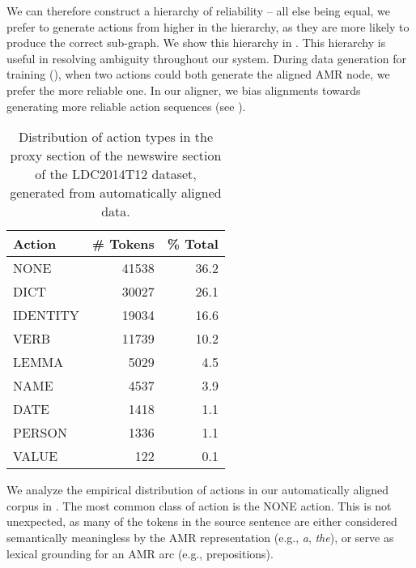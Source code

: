\documentclass[11pt]{article}
\newcommand\w[1]{\textit{#1}} %
\begin{document}

We can therefore construct a hierarchy of reliability -- all else being equal, we
  prefer to generate actions from higher in the hierarchy, as they are more likely
  to produce the correct sub-graph.
We show this hierarchy in .
This hierarchy is useful in resolving ambiguity throughout our system. 
During data generation for training (), when two actions could both generate the aligned AMR node, we prefer the more reliable one.
In our aligner, we bias alignments towards generating more reliable action sequences (see ).



%
%

\begin{table}[h]
\begin{center}
\begin{tabular}{l|rr}
\bf Action & \bf \# Tokens & \bf \% Total \\ \hline
NONE & 41538 & 36.2 \\
DICT & 30027 & 26.1 \\
IDENTITY & 19034 & 16.6 \\
VERB & 11739 & 10.2 \\
LEMMA & 5029 & 4.5 \\
NAME & 4537 & 3.9 \\
DATE & 1418 & 1.1 \\
PERSON & 1336 & 1.1 \\
VALUE & 122  & 0.1\\
\end{tabular}
\end{center}
\caption{\label{tab:distro} Distribution of action types in the proxy section of the newswire section of the LDC2014T12 dataset, generated from automatically aligned data. }
\end{table}

We analyze the empirical distribution of actions in our automatically 
  aligned corpus in .
The most common class of action is the NONE action.
This is not unexpected, as many of the tokens in the source sentence are either
  considered semantically meaningless by the AMR representation (e.g.,
  \w{a}, \w{the}), or serve as lexical grounding for an AMR arc (e.g.,
  prepositions).
\end{document}
